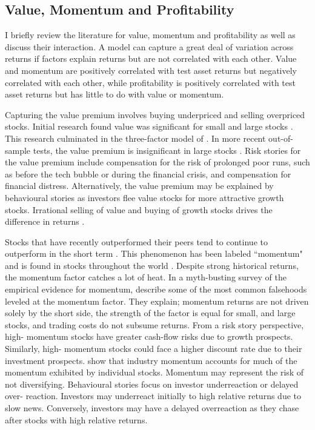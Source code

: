
\subsection{Value, Momentum and Profitability}

I briefly review the literature for value, momentum and profitability as well as discuss
their interaction. A model can capture a great deal of variation across returns if factors
explain returns but are not correlated with each other. Value and momentum are positively
correlated with test asset returns but negatively correlated with each other, while
profitability is positively correlated with test asset returns but has little to do with
value or momentum.

Capturing the value premium involves buying underpriced and selling overpriced stocks.
Initial research found value was significant for small and large stocks
\parencite{fama1992cross}. This research culminated in the three-factor model of
\textcite{fama1993common}. In more recent out-of-sample tests, the value premium is
insignificant in large stocks \parencite{asness2015fact}. Risk stories for the value
premium include compensation for the risk of prolonged poor runs, such as before the tech
bubble or during the financial crisis, and compensation for financial distress.
Alternatively, the value premium may be explained by behavioural stories as investors flee
value stocks for more attractive growth stocks. Irrational selling of value and buying of
growth stocks drives the difference in returns \parencite{bondt1985does}.

Stocks that have recently outperformed their peers tend to continue to outperform in the
short term \parencite{jegadeesh1993returns}. This phenomenon has been labeled ``momentum"
and is found in stocks throughout the world \parencite{asness2013value}. Despite strong
historical returns, the momentum factor catches a lot of heat. In a myth-busting survey of
the empirical evidence for momentum, \textcite{asness2014fact} describe some of the most
common falsehoods leveled at the momentum factor. They explain; momentum returns are not
driven solely by the short side, the strength of the factor is equal for small, and large
stocks, and trading costs do not subsume returns. From a risk story perspective, high-
momentum stocks have greater cash-flow risks due to growth prospects. Similarly, high-
momentum stocks could face a higher discount rate due to their investment prospects.
\textcite{moskowitz1999industries} show that industry momentum accounts for much of the
momentum exhibited by individual stocks. Momentum may represent the risk of not
diversifying. Behavioural stories focus on investor underreaction or delayed over-
reaction. Investors may underreact initially to high relative returns due to slow news.
Conversely, investors may have a delayed overreaction as they chase after stocks with high
relative returns.

